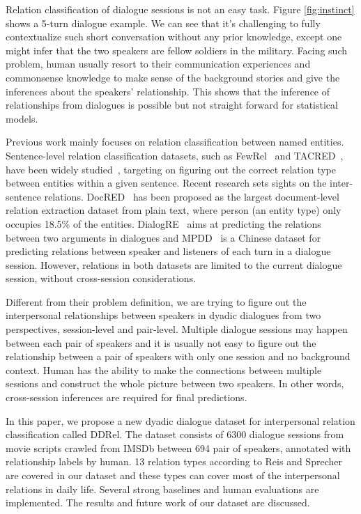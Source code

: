 Relation classification of dialogue sessions is not an easy task. Figure \ref{fig:instinct} shows a 5-turn dialogue example. We can see that it's challenging to fully contextualize such short conversation without any prior knowledge, 
except one might infer that the two speakers are fellow soldiers 
in the military. Facing such problem, human usually resort to their 
communication experiences and commonsense knowledge to make sense of the background stories and give the inferences about the speakers' relationship. This shows that the inference of relationships from dialogues is possible but not straight forward for statistical models.

Previous work mainly focuses on relation classification between named entities. 
Sentence-level relation classification datasets, such as FewRel~\cite{HanZYWYLS18} and  TACRED~\cite{ZhangZCAM17}, have been widely studied~\cite{Zhang0M18,GaoH0S19,ZhangHLJSL19}, targeting on figuring out the correct relation type between entities within a given sentence. Recent research sets sights on the 
inter-sentence relations. DocRED~\cite{YaoYLHLLLHZS19} has been proposed 
as the largest document-level relation extraction dataset from plain text, 
where person (an entity type) only occupies 18.5\% of the entities. 
DialogRE~\cite{YuSCY20} aims at predicting the relations between two arguments 
in dialogues and MPDD~\cite{ChenHC20} is a Chinese dataset for predicting relations between speaker and listeners of each turn in a dialogue session.
However, relations in both datasets are limited to the current dialogue session, without cross-session considerations.


Different from their problem definition, we are trying to figure out the interpersonal 
relationships between speakers in dyadic dialogues from two perspectives, session-level and pair-level.
Multiple dialogue sessions may happen between each pair of speakers and 
it is usually not easy to figure out the relationship between 
a pair of speakers with only one session and no background context. 
Human has the ability to make the connections between multiple sessions 
and construct the whole picture between two speakers. 
In other words, cross-session inferences are required for final predictions. 

In this paper, we propose a new dyadic dialogue dataset for 
interpersonal relation classification called DDRel. 
The dataset consists of 6300 dialogue sessions from movie scripts crawled 
from IMSDb between 694 pair of speakers, annotated with relationship labels 
by human. 13 relation types according to 
Reis and Sprecher~\cite{reis2009encyclopedia} are covered in our dataset and these types can cover most of the interpersonal relations in daily life. 
Several strong baselines and human evaluations are implemented. 
The results and future work of our dataset are discussed.

